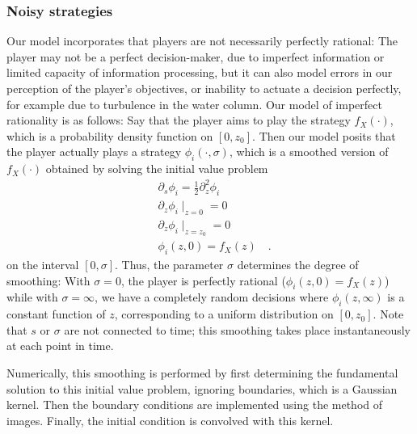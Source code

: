 \subsubsection*{Noisy strategies}
Our model incorporates that players are not necessarily perfectly rational: The player may not be a perfect decision-maker, due to imperfect information or limited capacity of information processing, but it can also model errors in our perception of the player's objectives, or inability to actuate a decision perfectly, for example due to turbulence in the water column. Our model of imperfect rationality is as follows: Say that the player aims to play the strategy $f_X(\cdot)$, which is a probability density function on $[0,z_0]$. Then our model posits that the player actually plays a strategy $\phi_i(\cdot ,\sigma)$, which is a smoothed version of $f_X(\cdot)$ obtained by solving the initial value problem
\begin{align}
  \label{eq:density_PDE}
  &\partial_s \phi_i = \frac{1}{2}\partial_z^2 \phi_i \\
  &\partial_z \phi_i \mid_{z=0} = 0 \\
  &\partial_z \phi_i \mid_{z = z_0} = 0 \\
  & \phi_i(z,0) = f_X(z) \quad .
\end{align}
on the interval $[0,\sigma]$. Thus, the parameter $\sigma$ determines the degree of smoothing: With $\sigma=0$, the player is perfectly rational ($\phi_i(z,0)=f_X(z)$) while with $\sigma=\infty$, we have a completely random decisions where $\phi_i(z,\infty)$ is a constant function of $z$, corresponding to a uniform distribution on $[0,z_0]$. Note that $s$ or $\sigma$ are not connected to time; this smoothing takes place instantaneously at each point in time.

Numerically, this smoothing is performed by first determining the fundamental solution to this initial value problem, ignoring boundaries, which is a Gaussian kernel. Then the boundary conditions are implemented using the method of images. Finally, the initial condition is convolved with this kernel.



